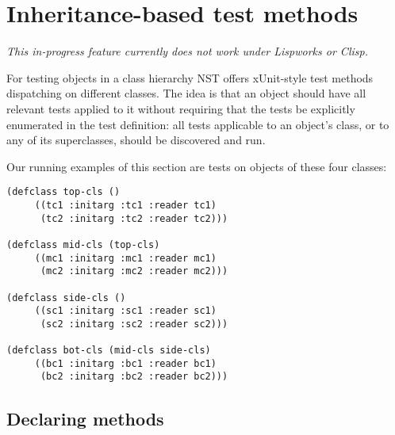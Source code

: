 
\section{Inheritance-based test methods}
\label{sec:methods}
\emph{This in-progress feature currently does not work under Lispworks or Clisp.}

For testing objects in a class hierarchy NST offers xUnit-style test
methods dispatching on different classes.  The idea is that an object
should have all relevant tests applied to it without requiring that
the tests be explicitly enumerated in the test definition: all tests
applicable to an object's class, or to any of its superclasses, should
be discovered and run.

Our running examples of this section are tests on objects of these
four classes:
\begin{verbatim}
(defclass top-cls ()
     ((tc1 :initarg :tc1 :reader tc1)
      (tc2 :initarg :tc2 :reader tc2)))

(defclass mid-cls (top-cls)
     ((mc1 :initarg :mc1 :reader mc1)
      (mc2 :initarg :mc2 :reader mc2)))

(defclass side-cls ()
     ((sc1 :initarg :sc1 :reader sc1)
      (sc2 :initarg :sc2 :reader sc2)))

(defclass bot-cls (mid-cls side-cls)
     ((bc1 :initarg :bc1 :reader bc1)
      (bc2 :initarg :bc2 :reader bc2)))
\end{verbatim}

\subsection{Declaring methods}



\begin{verbatim}


\end{verbatim}

